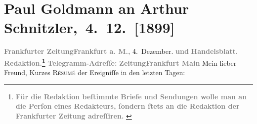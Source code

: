 

         
         \renewcommand{\erwaehntePersonen}{Personen: Berthold Frischauer, Theodore Rottenberg}
         \renewcommand{\erwaehnteInstitutionen}{Institutionen: Frankfurter Zeitung, Neue Freie Presse}
         \renewcommand{\erwaehnteOrte}{Orte: Berlin, Frankfurt am Main, Gärtnerweg, Paris, Wien}
         \renewcommand{\erwaehnteWerke}{}
               \section[ Paul Goldmann an Arthur Schnitzler, 4. 12. {[}1899{]}]{ Paul Goldmann an Arthur Schnitzler, 4. 12. {[}1899{]}}\nopagebreak{}\rehead{ }\begin{ledgroupsized}[t]{13cm}\normalsize\beginnumbering \toendnotes[C]{\smallbreak\pagebreak[2]} 
\toendnotes[C]{\smallbreak}\pstart
           \noindent{}{\pb}\textcolor{gray}{\textbf{\textbf{Frankfurter Zeitung}}}\hfill \textcolor{gray}{\textbf{\textbf{Frankfurt a. M.,}}}{ }4. Dezember.\pend
           \pstart
           \textcolor{gray}{\textbf{und}}\pend
           \pstart
           \textcolor{gray}{\textbf{Handelsblatt.}}\pend
           \pstart
           \textcolor{gray}{\textbf{\textbf{Redaktion.}\footnote{\noindent{}\textcolor{gray}{\textbf{Für die Redaktion beſtimmte Briefe und Sendungen wolle man
                                  an die Perſon eines Redakteurs,
                              ſondern ſtets \textbf{an die Redaktion der Frankfurter Zeitung} adreſſiren. }}}}}\pend
           \pstart
           \textcolor{gray}{\textbf{Telegramm-Adreſſe:}}\pend
           \pstart
           \textcolor{gray}{\textbf{\textbf{ZeitungFrankfurt Main}}}\pend
           \pstart{}Mein lieber Freund,\pend\pstart
           Kurzes \textsc{Résumé} der Ereigniſſe in den letzten Tagen:\pend

\end{ledgroupsized}

